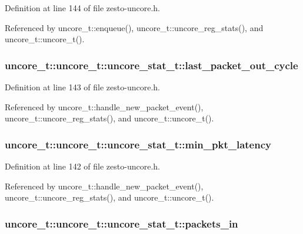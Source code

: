 Definition at line 144 of file zesto-uncore.h.

Referenced by uncore\_\-t::enqueue(), uncore\_\-t::uncore\_\-reg\_\-stats(), and uncore\_\-t::uncore\_\-t().
\subsubsection[{last\_\-packet\_\-out\_\-cycle}]{ uncore\_\-t::uncore\_\-t::uncore\_\-stat\_\-t::last\_\-packet\_\-out\_\-cycle}\label{structuncore__t_1_1uncore__stat__t_bcc40bded7d4e787282c7e9ab105182a}




Definition at line 143 of file zesto-uncore.h.

Referenced by uncore\_\-t::handle\_\-new\_\-packet\_\-event(), uncore\_\-t::uncore\_\-reg\_\-stats(), and uncore\_\-t::uncore\_\-t().
\subsubsection[{min\_\-pkt\_\-latency}]{ uncore\_\-t::uncore\_\-t::uncore\_\-stat\_\-t::min\_\-pkt\_\-latency}\label{structuncore__t_1_1uncore__stat__t_e2fafd7270c375b17c26098ff2f21b00}




Definition at line 142 of file zesto-uncore.h.

Referenced by uncore\_\-t::handle\_\-new\_\-packet\_\-event(), uncore\_\-t::uncore\_\-reg\_\-stats(), and uncore\_\-t::uncore\_\-t().
\subsubsection[{packets\_\-in}]{ uncore\_\-t::uncore\_\-t::uncore\_\-stat\_\-t::packets\_\-in}\label{structuncore__t_1_1uncore__stat__t_8e5086675964a50d750ba7f0bebc8d0e}




